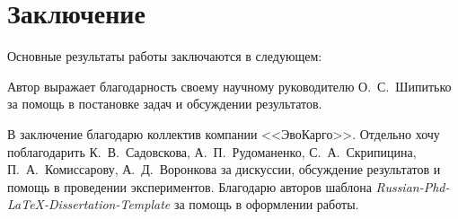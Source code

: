  \chapter*{Заключение}                       %


Основные результаты работы заключаются в следующем:


Автор выражает благодарность своему научному руководителю О.~С.~Шипитько за помощь в постановке задач и обсуждении результатов.

В заключение благодарю коллектив компании <<ЭвоКарго>>. Отдельно хочу поблагодарить К.~В.~Садовскова, А.~П.~Рудоманенко, С.~А.~Скрипицина, П.~А.~Комиссарову, А.~Д.~Воронкова за дискуссии, обсуждение результатов и помощь в проведении экспериментов. Благодарю авторов шаблона \textit{Russian-Phd-LaTeX-Dissertation-Template} за по­мощь в оформлении работы.
